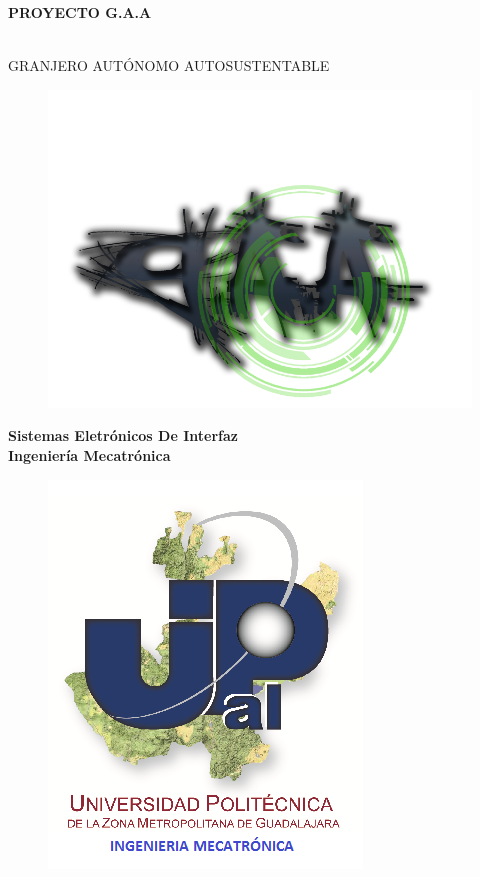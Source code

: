 \documentclass[11pt,a4paper]{article}
\author{Miguel Angel Xamie Diaz Fuentes}
\begin{document}
\begin{center}
\begin{LARGE}
\textbf{PROYECTO G.A.A}
\end{LARGE}
\\
GRANJERO AUTÓNOMO AUTOSUSTENTABLE\\

\begin{figure}[hbtp]
\centering
\includegraphics[scale=0.30]{LOGO.png}
\end{figure}
\textbf{{\Large Sistemas Eletrónicos De Interfaz\\Ingeniería Mecatrónica}}\\
\begin{figure}[hbtp]
\centering
\includegraphics[scale=0.50]{UPZMG_Mecatr_nica.png}
\end{figure} 



\end{center}
\end{document}

